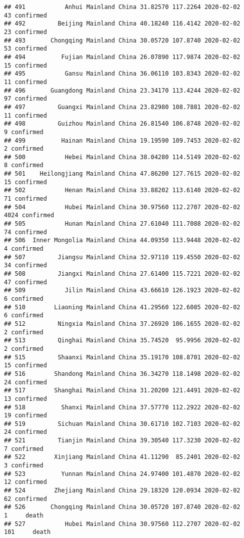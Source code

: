 \documentclass[
]{article}
\begin{document}
\begin{verbatim}
## 491           Anhui Mainland China 31.82570 117.2264 2020-02-02    43 confirmed
## 492         Beijing Mainland China 40.18240 116.4142 2020-02-02    23 confirmed
## 493       Chongqing Mainland China 30.05720 107.8740 2020-02-02    53 confirmed
## 494          Fujian Mainland China 26.07890 117.9874 2020-02-02    15 confirmed
## 495           Gansu Mainland China 36.06110 103.8343 2020-02-02    11 confirmed
## 496       Guangdong Mainland China 23.34170 113.4244 2020-02-02    97 confirmed
## 497         Guangxi Mainland China 23.82980 108.7881 2020-02-02    11 confirmed
## 498         Guizhou Mainland China 26.81540 106.8748 2020-02-02     9 confirmed
## 499          Hainan Mainland China 19.19590 109.7453 2020-02-02     2 confirmed
## 500           Hebei Mainland China 38.04280 114.5149 2020-02-02     8 confirmed
## 501    Heilongjiang Mainland China 47.86200 127.7615 2020-02-02    15 confirmed
## 502           Henan Mainland China 33.88202 113.6140 2020-02-02    71 confirmed
## 504           Hubei Mainland China 30.97560 112.2707 2020-02-02  4024 confirmed
## 505           Hunan Mainland China 27.61040 111.7088 2020-02-02    74 confirmed
## 506  Inner Mongolia Mainland China 44.09350 113.9448 2020-02-02     4 confirmed
## 507         Jiangsu Mainland China 32.97110 119.4550 2020-02-02    34 confirmed
## 508         Jiangxi Mainland China 27.61400 115.7221 2020-02-02    47 confirmed
## 509           Jilin Mainland China 43.66610 126.1923 2020-02-02     6 confirmed
## 510        Liaoning Mainland China 41.29560 122.6085 2020-02-02     6 confirmed
## 512         Ningxia Mainland China 37.26920 106.1655 2020-02-02     2 confirmed
## 513         Qinghai Mainland China 35.74520  95.9956 2020-02-02     2 confirmed
## 515         Shaanxi Mainland China 35.19170 108.8701 2020-02-02    15 confirmed
## 516        Shandong Mainland China 36.34270 118.1498 2020-02-02    24 confirmed
## 517        Shanghai Mainland China 31.20200 121.4491 2020-02-02    13 confirmed
## 518          Shanxi Mainland China 37.57770 112.2922 2020-02-02    19 confirmed
## 519         Sichuan Mainland China 30.61710 102.7103 2020-02-02    24 confirmed
## 521         Tianjin Mainland China 39.30540 117.3230 2020-02-02     7 confirmed
## 522        Xinjiang Mainland China 41.11290  85.2401 2020-02-02     3 confirmed
## 523          Yunnan Mainland China 24.97400 101.4870 2020-02-02    12 confirmed
## 524        Zhejiang Mainland China 29.18320 120.0934 2020-02-02    62 confirmed
## 526       Chongqing Mainland China 30.05720 107.8740 2020-02-02     1     death
## 527           Hubei Mainland China 30.97560 112.2707 2020-02-02   101     death

\end{verbatim}
\end{document}
